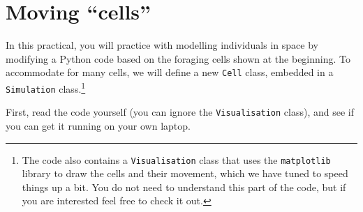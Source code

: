 \documentclass[
  letterpaper,
  DIV=11,
  numbers=noendperiod]{scrreprt}
\theoremstyle{definition}
\theoremstyle{remark}
\begin{document}
\section{Moving ``cells''}\label{moving-cells}

In this practical, you will practice with modelling individuals in space
by modifying a Python code based on the foraging cells shown at the
beginning. To accommodate for many cells, we will define a new
\texttt{Cell} class, embedded in a \texttt{Simulation} class.\footnote{The
  code also contains a \texttt{Visualisation} class that uses the
  \texttt{matplotlib} library to draw the cells and their movement,
  which we have tuned to speed things up a bit. You do not need to
  understand this part of the code, but if you are interested feel free
  to check it out.}

First, read the code yourself (you can ignore the \texttt{Visualisation}
class), and see if you can get it running on your own laptop.
\end{document}
